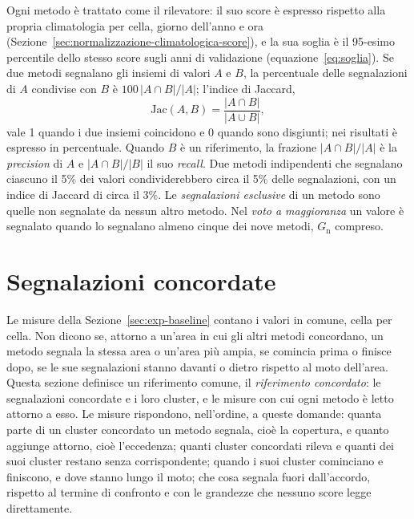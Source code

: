 Ogni metodo è trattato come il rilevatore: il suo score è espresso rispetto alla propria climatologia per cella, giorno dell'anno e ora (Sezione~\ref{sec:normalizzazione-climatologica-score}), e la sua soglia è il 95-esimo percentile dello stesso score sugli anni di validazione (equazione~\eqref{eq:soglia}). Se due metodi segnalano gli insiemi di valori $A$ e $B$, la percentuale delle segnalazioni di $A$ condivise con $B$ è $100\,|A\cap B|/|A|$; l'indice di Jaccard,
\begin{equation}
\mathrm{Jac}(A,B)=\frac{|A\cap B|}{|A\cup B|},
\label{eq:jaccard}
\end{equation}
vale 1 quando i due insiemi coincidono e 0 quando sono disgiunti; nei risultati è espresso in percentuale. Quando $B$ è un riferimento, la frazione $|A\cap B|/|A|$ è la \emph{precision} di $A$ e $|A\cap B|/|B|$ il suo \emph{recall}. Due metodi indipendenti che segnalano ciascuno il 5\% dei valori condividerebbero circa il 5\% delle segnalazioni, con un indice di Jaccard di circa il 3\%. Le \emph{segnalazioni esclusive} di un metodo sono quelle non segnalate da nessun altro metodo. Nel \emph{voto a maggioranza} un valore è segnalato quando lo segnalano almeno cinque dei nove metodi, $G_{\mathrm{n}}$ compreso.

\section{Segnalazioni concordate}
\label{sec:exp-concordate}

Le misure della Sezione~\ref{sec:exp-baseline} contano i valori in comune, cella per cella. Non dicono se, attorno a un'area in cui gli altri metodi concordano, un metodo segnala la stessa area o un'area più ampia, se comincia prima o finisce dopo, se le sue segnalazioni stanno davanti o dietro rispetto al moto dell'area. Questa sezione definisce un riferimento comune, il \emph{riferimento concordato}: le segnalazioni concordate e i loro cluster, e le misure con cui ogni metodo è letto attorno a esso. Le misure rispondono, nell'ordine, a queste domande: quanta parte di un cluster concordato un metodo segnala, cioè la copertura, e quanto aggiunge attorno, cioè l'eccedenza; quanti cluster concordati rileva e quanti dei suoi cluster restano senza corrispondente; quando i suoi cluster cominciano e finiscono, e dove stanno lungo il moto; che cosa segnala fuori dall'accordo, rispetto al termine di confronto e con le grandezze che nessuno score legge direttamente.

